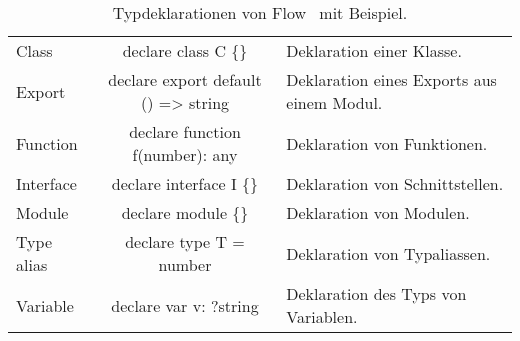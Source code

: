 \begin{table}[tbh]
  \caption{Typdeklarationen von Flow~\autocite{FLOW:LIBRARY_DEFINITIONS} mit Beispiel.}
  \footnotesize
  \begin{tabu} to 
    \midrule
     &  &  \\
    \midrule
    Class       & declare class C \{\}                & Deklaration einer Klasse. \\
    Export      & declare export default () => string & Deklaration eines Exports aus einem Modul. \\
    Function    & declare function f(number): any     & Deklaration von Funktionen. \\
    Interface   & declare interface I \{\}            & Deklaration von Schnittstellen. \\
    Module      & declare module  \{\}         & Deklaration von Modulen. \\
    Type alias  & declare type T = number             & Deklaration von Typaliassen. \\
    Variable    & declare var v: ?string              & Deklaration des Typs von Variablen. \\
    \midrule
  \end{tabu}
  \label{tab:flow-type-declarations}
\end{table}
